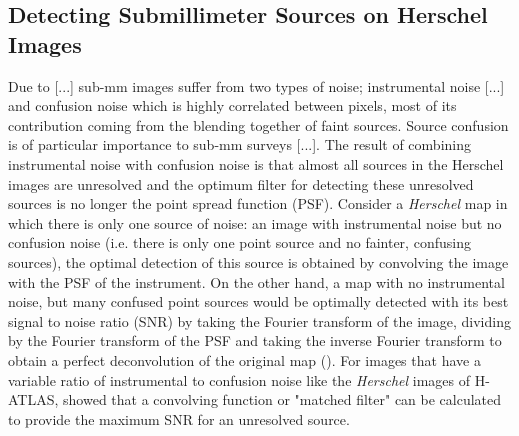\subsection{Detecting Submillimeter Sources on Herschel Images}
\label{sec:Detecting Submillimeter Sources on Herschel Images}

Due to [...] sub-mm images suffer from two types of noise; instrumental noise [...] and confusion noise which is highly correlated between pixels, most of its contribution coming from the blending together of faint sources. Source confusion is of particular importance to sub-mm surveys [...]. The result of combining instrumental noise with confusion noise is that almost all sources in the Herschel images are unresolved and the optimum filter for detecting these unresolved sources is no longer the point spread function (PSF). Consider a \textit{Herschel} map in which there is only one source of noise: an image with instrumental noise but no confusion noise (i.e. there is only one point source and no fainter, confusing sources), the optimal detection of this source is obtained by convolving the image with the PSF of the instrument. On the other hand, a map with no instrumental noise, but many confused point sources would be optimally detected with its best signal to noise ratio (SNR) by taking the Fourier transform of the image, dividing by the Fourier transform of the PSF and taking the inverse Fourier transform to obtain a perfect deconvolution of the original map (\citealt{Valiante_2016}). For images that have a variable ratio of instrumental to confusion noise like the \textit{Herschel} images of H-ATLAS, \citealt{Chapin_2011} showed that a convolving function or "matched filter" can be calculated to provide the maximum SNR for an unresolved source.

